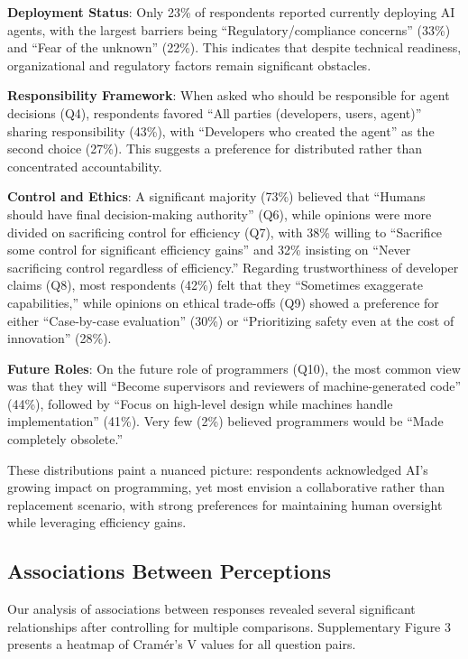 \documentclass{article}
\begin{document}
\textbf{Deployment Status}: Only 23\% of respondents reported currently
deploying AI agents, with the largest barriers being
``Regulatory/compliance concerns'' (33\%) and ``Fear of the unknown''
(22\%). This indicates that despite technical readiness, organizational
and regulatory factors remain significant obstacles.

\textbf{Responsibility Framework}: When asked who should be responsible
for agent decisions (Q4), respondents favored ``All parties (developers,
users, agent)'' sharing responsibility (43\%), with ``Developers who
created the agent'' as the second choice (27\%). This suggests a
preference for distributed rather than concentrated accountability.

\textbf{Control and Ethics}: A significant majority (73\%) believed that
``Humans should have final decision-making authority'' (Q6), while
opinions were more divided on sacrificing control for efficiency (Q7),
with 38\% willing to ``Sacrifice some control for significant efficiency
gains'' and 32\% insisting on ``Never sacrificing control regardless of
efficiency.'' Regarding trustworthiness of developer claims (Q8), most
respondents (42\%) felt that they ``Sometimes exaggerate capabilities,''
while opinions on ethical trade-offs (Q9) showed a preference for either
``Case-by-case evaluation'' (30\%) or ``Prioritizing safety even at the
cost of innovation'' (28\%).

\textbf{Future Roles}: On the future role of programmers (Q10), the most
common view was that they will ``Become supervisors and reviewers of
machine-generated code'' (44\%), followed by ``Focus on high-level
design while machines handle implementation'' (41\%). Very few (2\%)
believed programmers would be ``Made completely obsolete.''

These distributions paint a nuanced picture: respondents acknowledged
AI's growing impact on programming, yet most envision a collaborative
rather than replacement scenario, with strong preferences for
maintaining human oversight while leveraging efficiency gains.

\subsection{Associations Between
Perceptions}\label{associations-between-perceptions}

Our analysis of associations between responses revealed several
significant relationships after controlling for multiple comparisons.
Supplementary Figure 3 presents a heatmap of Cramér's V
values for all question pairs.
\end{document}
